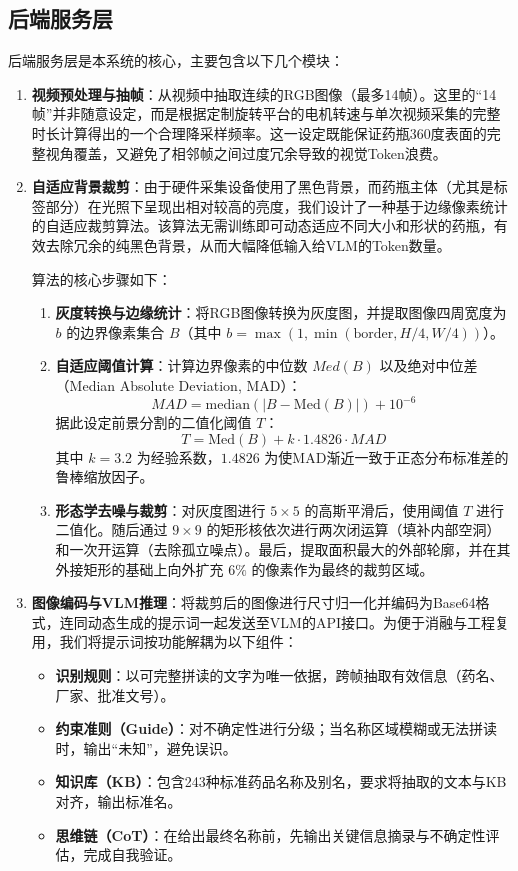 \documentclass[11pt,a4paper]{ctexart}
\begin{document}
\subsection{后端服务层}
后端服务层是本系统的核心，主要包含以下几个模块：
\begin{enumerate}
    \item \textbf{视频预处理与抽帧}：从视频中抽取连续的RGB图像（最多14帧）。这里的“14帧”并非随意设定，而是根据定制旋转平台的电机转速与单次视频采集的完整时长计算得出的一个合理降采样频率。这一设定既能保证药瓶360度表面的完整视角覆盖，又避免了相邻帧之间过度冗余导致的视觉Token浪费。
    \item \textbf{自适应背景裁剪}：由于硬件采集设备使用了黑色背景，而药瓶主体（尤其是标签部分）在光照下呈现出相对较高的亮度，我们设计了一种基于边缘像素统计的自适应裁剪算法。该算法无需训练即可动态适应不同大小和形状的药瓶，有效去除冗余的纯黑色背景，从而大幅降低输入给VLM的Token数量。

    算法的核心步骤如下：
    \begin{enumerate}
        \item \textbf{灰度转换与边缘统计}：将RGB图像转换为灰度图，并提取图像四周宽度为 $b$ 的边界像素集合 $B$（其中 $b = \max(1, \min(\text{border}, H/4, W/4))$）。
        \item \textbf{自适应阈值计算}：计算边界像素的中位数 $Med(B)$ 以及绝对中位差（Median Absolute Deviation, MAD）：
        \begin{equation}
            MAD = \mathrm{median}(|B - \mathrm{Med}(B)|) + 10^{-6}
        \end{equation}
        据此设定前景分割的二值化阈值 $T$：
        \begin{equation}
            T = \mathrm{Med}(B) + k \cdot 1.4826 \cdot MAD
        \end{equation}
        其中 $k=3.2$ 为经验系数，$1.4826$ 为使MAD渐近一致于正态分布标准差的鲁棒缩放因子。
        \item \textbf{形态学去噪与裁剪}：对灰度图进行 $5\times5$ 的高斯平滑后，使用阈值 $T$ 进行二值化。随后通过 $9\times9$ 的矩形核依次进行两次闭运算（填补内部空洞）和一次开运算（去除孤立噪点）。最后，提取面积最大的外部轮廓，并在其外接矩形的基础上向外扩充 $6\%$ 的像素作为最终的裁剪区域。
    \end{enumerate}
    \item \textbf{图像编码与VLM推理}：将裁剪后的图像进行尺寸归一化并编码为Base64格式，连同动态生成的提示词一起发送至VLM的API接口。为便于消融与工程复用，我们将提示词按功能解耦为以下组件：
    \begin{itemize}
        \item \textbf{识别规则}：以可完整拼读的文字为唯一依据，跨帧抽取有效信息（药名、厂家、批准文号）。
        \item \textbf{约束准则（Guide）}：对不确定性进行分级；当名称区域模糊或无法拼读时，输出“未知”，避免误识。
        \item \textbf{知识库（KB）}：包含243种标准药品名称及别名，要求将抽取的文本与KB对齐，输出标准名。
        \item \textbf{思维链（CoT）}：在给出最终名称前，先输出关键信息摘录与不确定性评估，完成自我验证。
    \end{itemize}
\end{enumerate}
\end{document}
